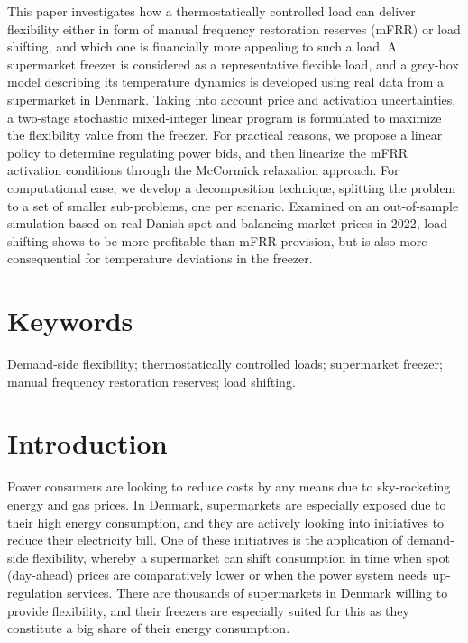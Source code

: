 \documentclass[11pt,a4paper]{article}
\begin{document}
This paper investigates how a  thermostatically controlled load can deliver flexibility either in form of manual frequency restoration reserves (mFRR) or load shifting, and which one is financially more appealing to such a load. %
A supermarket freezer is considered as a representative flexible load, and a grey-box model  describing its temperature dynamics is developed using real data from a supermarket in Denmark. Taking into account price and activation uncertainties, a two-stage stochastic mixed-integer linear program is formulated to maximize the flexibility value from the freezer. For practical reasons, we propose a linear policy to determine regulating power bids, and then linearize the mFRR activation conditions through the  McCormick relaxation approach. For computational ease, we develop a decomposition technique, splitting the problem to a set of smaller sub-problems, one per scenario. %
%
%
Examined on an out-of-sample simulation based on real Danish spot and balancing market prices in 2022, load shifting shows to be more profitable than mFRR provision, but is also more consequential for temperature deviations in the freezer.

\section*{Keywords}

Demand-side flexibility; thermostatically controlled loads; supermarket freezer; manual frequency restoration reserves; load shifting.

\section{Introduction}


Power consumers are looking to reduce costs by any means due to sky-rocketing energy and gas prices. In Denmark, supermarkets are especially exposed due to their high energy consumption, and they are actively looking into initiatives to reduce their electricity bill. One of these initiatives is the application of demand-side flexibility, whereby a supermarket can shift consumption in time when spot (day-ahead) prices are comparatively lower or when the power system needs up-regulation services. There are thousands of supermarkets in Denmark willing to provide flexibility, and their freezers are especially suited for this as they constitute a big share of their energy consumption.
\end{document}
